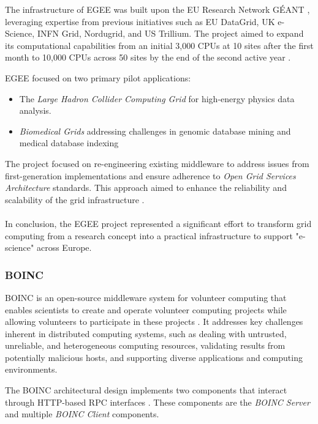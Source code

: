 The infrastructure of \ac{EGEE} was built upon the EU Research Network GÉANT \cite{background:geant}, leveraging expertise from previous initiatives such as EU DataGrid, UK e-Science, INFN Grid, Nordugrid, and US Trillium. The project aimed to expand its computational capabilities from an initial 3,000 \acs{CPU}s at 10 sites after the first month to 10,000 \acs{CPU}s across 50 sites by the end of the second active year \cite{relatedwork:egee}.

\ac{EGEE} focused on two primary pilot applications: 
\begin{itemize}
  \item The \emph{Large Hadron Collider Computing Grid} for high-energy physics data analysis.
  \item \emph{Biomedical Grids} addressing challenges in genomic database mining and medical database indexing
\end{itemize}
The project focused on re-engineering existing middleware to address issues from first-generation implementations and ensure adherence to \emph{Open Grid Services Architecture} standards. This approach aimed to enhance the reliability and scalability of the grid infrastructure \cite{relatedwork:egee}.
\\~\\
In conclusion, the \ac{EGEE} project represented a significant effort to transform grid computing from a research concept into a practical infrastructure to support "e-science" across Europe.

\subsubsection{BOINC}
\label{subsec:background:related_work:boinc}
\ac{BOINC} is an open-source middleware system for volunteer computing that enables scientists to create and operate volunteer computing projects while allowing volunteers to participate in these projects \cite{relatedwork:boinc1}. It addresses key challenges inherent in distributed computing systems, such as dealing with untrusted, unreliable, and heterogeneous computing resources, validating results from potentially malicious hosts, and supporting diverse applications and computing environments.

The \ac{BOINC} architectural design implements two components that interact through \acs{HTTP}-based \ac{RPC} interfaces \cite{relatedwork:boinc1}. These components are the \emph{\ac{BOINC} Server} and multiple \emph{\ac{BOINC} Client} components.

